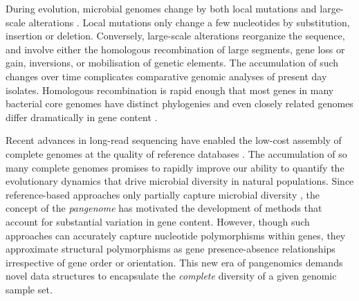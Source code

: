 \documentclass[aps,rmp,preprint,superscriptaddress,10pt,linenumbers]{revtex4-1}
\begin{document}
\maketitle

During evolution, microbial genomes change by both local mutations and large-scale alterations \cite{arnold2021horizontal}.
Local mutations only change a few nucleotides by substitution, insertion or deletion.
Conversely, large-scale alterations reorganize the sequence, and involve either the homologous recombination of large segments, gene loss or gain, inversions, or mobilisation of genetic elements.
The accumulation of such changes over time complicates comparative genomic analyses of present day isolates.
Homologous recombination is rapid enough that most genes in many bacterial core genomes have distinct phylogenies \cite{sakoparnig2021whole} and even closely related genomes differ dramatically in gene content \cite{touchon2020phylogenetic,touchon2009organised,doolittle2009origin}.

Recent advances in long-read sequencing have enabled the low-cost assembly of complete genomes at the quality of reference databases \cite{whibley2021changing}.
The accumulation of so many complete genomes promises to rapidly improve our ability to quantify the evolutionary dynamics that drive microbial diversity in natural populations.
Since reference-based approaches only partially capture microbial diversity \cite{tettelin2008comparative}, the concept of the \emph{pangenome} has motivated the development of methods that account for substantial variation in gene content.
However, though such approaches can accurately capture nucleotide polymorphisms within genes, they approximate structural polymorphisms as gene presence-absence relationships \cite{page2015roary,ding2018panx} irrespective of gene order or orientation.
This new era of pangenomics demands novel data structures to encapsulate the \emph{complete} diversity of a given genomic sample set.
\end{document}
